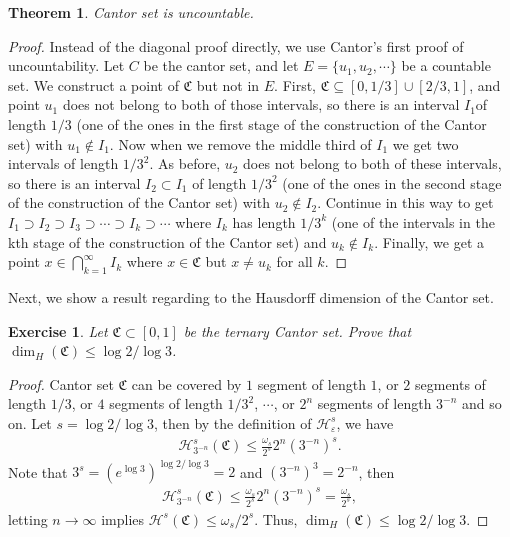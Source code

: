 \documentclass[11pt]{book}
\newtheorem{theorem}{Theorem}[chapter]
\newtheorem{exercise}{Exercise}[section]
\theoremstyle{definition}
\numberwithin{equation}{chapter}
\def\CC{\mathfrak{C}}
\def\H{{\mathcal H}}
\begin{document}
\medskip

\begin{theorem}
Cantor set is uncountable.
\end{theorem}
\begin{proof}\cite{14} Instead of the diagonal proof directly, we use Cantor's first proof of uncountability. Let $C$ be the cantor set, and let $E = \{u_1,u_2,\cdots\}$ be a countable set. We construct a point of $\CC$ but not in $E$. First, $\CC \subseteq [0,1/3] \cup [2/3,1]$, and point $u_1$ does not belong to both of those intervals, so there is an interval $I_1$of length $1/3$ (one of the ones in the first stage of the construction of the Cantor set) with $u_1 \notin I_1$. Now when we remove the middle third of $I_1$ we get two intervals of length $1/3^2$. As before, $u_2$ does not belong to both of these intervals, so there is an interval $I_2 \subset I_1$ of length $1/3^2$ (one of the ones in the second stage of the construction of the Cantor set) with $u_2 \notin I_2$. Continue in this way to get $I_1 \supset I_2 \supset I_3 \supset \cdots \supset I_k \supset \cdots$ where $I_k$ has length $1/3^k$ (one of the intervals in the kth stage of the construction of the Cantor set) and $u_k \notin I_k$. Finally, we get a point $x \in \bigcap^\infty_{k=1} I_k$ where $x \in \CC$ but $x \neq u_k$ for all $k$.
\end{proof}

\medskip

Next, we show a result regarding to the Hausdorff  dimension of the Cantor set.

\medskip

\begin{exercise}\label{exe_13}
Let $\CC \subset [0,1]$ be the ternary Cantor set. Prove that $\dim_{H}(\CC) \leq \log 2/\log 3$.
\end{exercise}
\begin{proof}
Cantor set $\CC$ can be covered by $1$ segment of length $1$, or $2$ segments of length $1/3$, or $4$ segments of length $1/3^2$, $\cdots$, or $2^n$ segments of length $3^{-n}$ and so on. Let $s = \log 2/\log 3$, then by the definition of $\H^s_{\varepsilon}$, we have
\begin{align*}
    \H^s_{3^{-n}}(\CC) \leq \frac{\omega_s}{2^s} 2^n \left(3^{-n}\right)^s.
\end{align*}
Note that $3^s = \left(e^{\log 3}\right)^{\log 2/\log 3} = 2$ and $\left(3^{-n}\right)^3 = 2^{-n}$, then 
\begin{align*}
    \H^s_{3^{-n}}(\CC) \leq \frac{\omega_s}{2^s} 2^n \left(3^{-n}\right)^s = \frac{\omega_s}{2^s},
\end{align*}
letting $n \to \infty$ implies $\H^s(\CC) \leq \omega_s / 2^s$. Thus, $\dim_{H}(\CC) \leq \log 2/\log 3$.
\end{proof}
\end{document}
